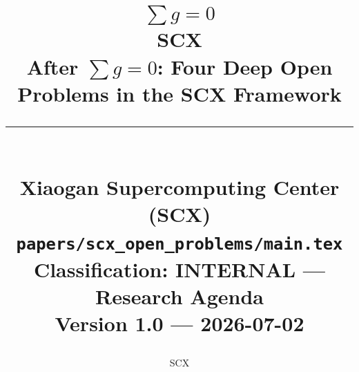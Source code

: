 \documentclass[12pt,a4paper]{article}
\theoremstyle{remark}
\begin{document}

\title{
    \vspace{2cm}
    {\Huge \textbf{$\displaystyle\sum g = 0$}}\\[0.3cm]
    {\LARGE \textbf{SCX}}\\[0.5cm]
    {\large \textcolor{scxblue}{After $\displaystyle\sum g = 0$: Four Deep Open Problems in the SCX Framework}}\\[1cm]
    \rule{\textwidth}{1.5pt}\\[0.5cm]
    {\normalsize Xiaogan Supercomputing Center (SCX)}\\[0.2cm]
    {\small \texttt{papers/scx\_open\_problems/main.tex}}\\[0.2cm]
    {\small Classification: INTERNAL — Research Agenda}\\[0.2cm]
    {\small Version 1.0 — 2026-07-02}
    \vspace{1cm}
}

\author{SCX}
\date{}

\maketitle
\thispagestyle{empty}

\newpage

\end{document}
